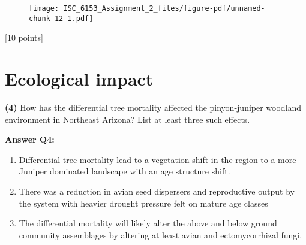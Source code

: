 \documentclass[
  letterpaper,
  DIV=11,
  numbers=noendperiod]{scrartcl}
\providecommand{\tightlist}{%
  \setlength{\itemsep}{0pt}\setlength{\parskip}{0pt}}\usepackage{longtable,booktabs,array}
\begin{document}
\begin{figure}[H]

{\centering \texttt{[image: ISC\_6153\_Assignment\_2\_files/figure-pdf/unnamed-chunk-12-1.pdf]}

}

\end{figure}

{[}10 points{]}

\hypertarget{ecological-impact}{%
\section{Ecological impact}\label{ecological-impact}}

\textbf{(4)} How has the differential tree mortality affected the
pinyon-juniper woodland environment in Northeast Arizona? List at least
three such effects.

\textbf{Answer Q4:}

\begin{enumerate}
\def\labelenumi{\arabic{enumi}.}
\tightlist
\item
  Differential tree mortality lead to a vegetation shift in the region
  to a more Juniper dominated landscape with an age structure shift.
\item
  There was a reduction in avian seed dispersers and reproductive output
  by the system with heavier drought pressure felt on mature age classes
\item
  The differential mortality will likely alter the above and below
  ground community assemblages by altering at least avian and
  ectomycorrhizal fungi.
\end{enumerate}
\end{document}
